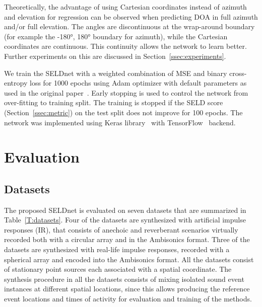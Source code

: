 \documentclass[journal]{IEEEtran}
\begin{document}
Theoretically, the advantage of using Cartesian coordinates instead of azimuth and elevation for regression can be observed when predicting DOA in full azimuth and/or full elevation. The angles are discontinuous at the wrap-around boundary (for example the \ang{-180}, \ang{180} boundary for azimuth), while the Cartesian coordinates are continuous. This continuity allows the network to learn better. Further experiments on this are discussed in Section~\ref{ssec:experiments}.

We train the SELDnet with a weighted combination of MSE and binary cross-entropy loss for 1000 epochs using Adam optimizer with default parameters as used in the original paper~\cite{adamKeras}. Early stopping is used to control the network from over-fitting to training split. The training is stopped if the SELD score (Section~\ref{ssec:metric}) on the test split does not improve for 100 epochs. The network was implemented using Keras library~\cite{chollet2015keras} with TensorFlow~\cite{tensorflow2015-whitepaper} backend.



\section{Evaluation}
\label{sec:evaluation}
\subsection{Datasets}
The proposed SELDnet is evaluated on seven datasets that are summarized in Table~\ref{T:datasets}. Four of the datasets are synthesized with artificial impulse responses (IR), that consists of anechoic and reverberant scenarios virtually recorded both with a circular array and in the Ambisonics format. Three of the datasets are synthesized with real-life impulse responses, recorded with a spherical array and encoded into the Ambisonics format. All the datasets consist of stationary point sources each associated with a spatial coordinate. The synthesis procedure in all the datasets consists of mixing isolated sound event instances at different spatial locations, since this allows producing the reference event locations and times of activity for evaluation and training of the methods.
\end{document}
